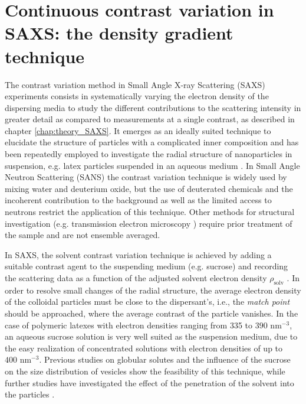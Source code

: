 \chapter{Continuous contrast variation in SAXS: the density gradient technique}
\label{chap:density_gradient_SAXS}
The contrast variation method in Small Angle X-ray Scattering (SAXS) experiments consists in systematically varying the electron density of the dispersing media to study the different contributions to the scattering intensity in greater detail as compared to measurements at a single contrast, as described in chapter \ref{chap:theory_SAXS}. It emerges as an ideally suited technique to elucidate the structure of particles with a complicated inner composition and has been repeatedly employed to investigate the radial structure of nanoparticles in suspension, e.g. latex particles suspended in an aqueous medium \citep{dingenouts_analysis_1999,ballauff_analysis_2011}. In Small Angle Neutron Scattering (SANS) the contrast variation technique is widely used by mixing water and deuterium oxide, but the use of deuterated chemicals and the incoherent contribution to the background as well as the limited access to neutrons restrict the application of this technique. Other methods for structural investigation (e.g. transmission electron microscopy \citep{joensson_morphology_1991,silverstein_microstructure_1989}) require prior treatment of the sample and are not ensemble averaged. 

In SAXS, the solvent contrast variation technique is achieved by adding a suitable contrast agent to the suspending medium (e.g. sucrose) and recording the scattering data as a function of the adjusted solvent electron density \( \rho_{\text{solv}} \) \citep{ballauff_saxs_2001-1,bolze_application_2003}. In order to resolve small changes of the radial structure, the average electron density of the colloidal particles must be close to the dispersant's, i.e., the \emph{match point} should be approached, where the average contrast of the particle vanishes. In the case of polymeric latexes with electron densities ranging from 335 to \(390 \mbox{ nm}^{-3}\), an aqueous sucrose solution is very well suited as the suspension medium, due to the easy realization of concentrated solutions with electron densities of up to \(400 \mbox{ nm}^{-3}\). Previous studies on globular solutes \citep{kawaguchi_isoscattering_1992} and the influence of the sucrose on the size distribution of vesicles \citep{kiselev_sucrose_2001-2} show the feasibility of this technique, while further studies have investigated the effect of the penetration of the solvent into the particles \citep{kawaguchi_isoscattering_1993}.

